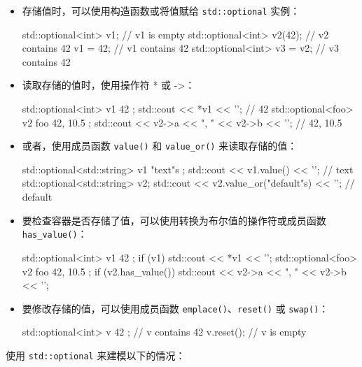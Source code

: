 \begin{itemize}
\item
存储值时，可以使用构造函数或将值赋给 \verb|std::optional| 实例：

\begin{cpp}
std::optional<int> v1;      // v1 is empty
std::optional<int> v2(42);  // v2 contains 42
v1 = 42;                    // v1 contains 42
std::optional<int> v3 = v2; // v3 contains 42
\end{cpp}

\item
读取存储的值时，使用操作符 * 或 ->：

\begin{cpp}
std::optional<int> v1{ 42 };
std::cout << *v1 << '\n';   // 42
std::optional<foo> v2{ foo{ 42, 10.5 } };
std::cout << v2->a << ", "
          << v2->b << '\n'; // 42, 10.5
\end{cpp}

\item
或者，使用成员函数 \verb|value()| 和 \verb|value_or()| 来读取存储的值：

\begin{cpp}
std::optional<std::string> v1{ "text"s };
std::cout << v1.value() << '\n'; // text
std::optional<std::string> v2;
std::cout << v2.value_or("default"s) << '\n'; // default
\end{cpp}

\item
要检查容器是否存储了值，可以使用转换为布尔值的操作符或成员函数 \verb|has_value()|：

\begin{cpp}
std::optional<int> v1{ 42 };
if (v1) std::cout << *v1 << '\n';
std::optional<foo> v2{ foo{ 42, 10.5 } };
if (v2.has_value())
    std::cout << v2->a << ", " << v2->b << '\n';
\end{cpp}

\item
要修改存储的值，可以使用成员函数 \verb|emplace()|、\verb|reset()| 或 \verb|swap()|：

\begin{cpp}
std::optional<int> v{ 42 }; // v contains 42
v.reset();                  // v is empty
\end{cpp}
\end{itemize}

使用 \verb|std::optional| 来建模以下的情况：

